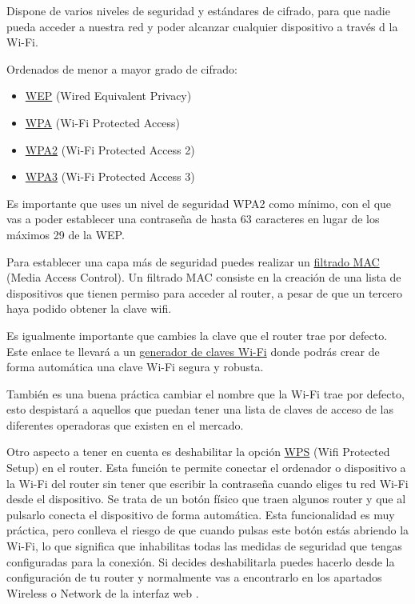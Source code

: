\documentclass[
  a4paper,
  openany]{book}
\providecommand{\tightlist}{%
  \setlength{\itemsep}{0pt}\setlength{\parskip}{0pt}}
\begin{document}
Dispone de varios niveles de seguridad y estándares de cifrado, para que nadie pueda acceder a nuestra red y poder alcanzar cualquier dispositivo a través d la Wi-Fi.

Ordenados de menor a mayor grado de cifrado:

\begin{itemize}
\tightlist
\item
  \href{https://es.wikipedia.org/wiki/Wired_Equivalent_Privacy}{WEP} (Wired Equivalent Privacy)
\item
  \href{https://es.wikipedia.org/wiki/Wi-Fi_Protected_Access}{WPA} (Wi-Fi Protected Access)
\item
  \href{https://es.wikipedia.org/wiki/WPA2}{WPA2} (Wi-Fi Protected Access 2)
\item
  \href{https://es.wikipedia.org/wiki/WPA3}{WPA3} (Wi-Fi Protected Access 3)
\end{itemize}

Es importante que uses un nivel de seguridad WPA2 como mínimo, con el que vas a poder establecer una contraseña de hasta 63 caracteres en lugar de los máximos 29 de la WEP.

Para establecer una capa más de seguridad puedes realizar un \href{https://es.wikipedia.org/wiki/Filtrado_MAC}{filtrado MAC} (Media Access Control). Un filtrado MAC consiste en la creación de una lista de dispositivos que tienen permiso para acceder al router, a pesar de que un tercero haya podido obtener la clave wifi.

Es igualmente importante que cambies la clave que el router trae por defecto. Este enlace te llevará a un \href{https://bandaancha.eu/generador-claves-wifi}{generador de claves Wi-Fi} donde podrás crear de forma automática una clave Wi-Fi segura y robusta.

También es una buena práctica cambiar el nombre que la Wi-Fi trae por defecto, esto despistará a aquellos que puedan tener una lista de claves de acceso de las diferentes operadoras que existen en el mercado.

Otro aspecto a tener en cuenta es deshabilitar la opción \href{https://es.wikipedia.org/wiki/Wi-Fi_Protected_Setup}{WPS} (Wifi Protected Setup) en el router. Esta función te permite conectar el ordenador o dispositivo a la Wi-Fi del router sin tener que escribir la contraseña cuando eliges tu red Wi-Fi desde el dispositivo. Se trata de un botón físico que traen algunos router y que al pulsarlo conecta el dispositivo de forma automática. Esta funcionalidad es muy práctica, pero conlleva el riesgo de que cuando pulsas este botón estás abriendo la Wi-Fi, lo que significa que inhabilitas todas las medidas de seguridad que tengas configuradas para la conexión. Si decides deshabilitarla puedes hacerlo desde la configuración de tu router y normalmente vas a encontrarlo en los apartados Wireless o Network de la interfaz web \citep{XATAKA-wps}.
\end{document}
